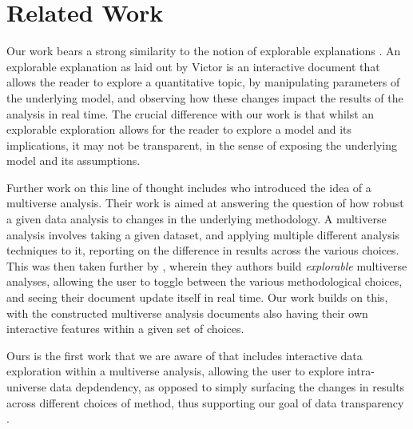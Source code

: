 \section{Related Work}
\label{sec:related}

Our work bears a strong similarity to the notion of explorable explanations \cite{victor11b}.
An explorable explanation as laid out by Victor is an interactive document that allows the reader to
explore a quantitative topic, by manipulating parameters of the underlying model, and observing how these
changes impact the results of the analysis in real time. The crucial difference with our work is that 
whilst an explorable exploration allows for the reader to explore a model and its implications, it may
not be transparent, in the sense of exposing the underlying model and its assumptions.

Further work on this line of thought includes \cite{steegen16} who introduced the idea of a multiverse
analysis. Their work is aimed at answering the question of how robust a given data analysis to changes
in the underlying methodology. A multiverse analysis involves taking a given dataset, and applying 
multiple different analysis techniques to it, reporting on the difference in results across the various choices.
This was then taken further by \cite{dragicevic19}, wherein they authors build \textit{explorable} multiverse
analyses, allowing the user to toggle between the various methodological choices, and seeing their document
update itself in real time. Our work builds on this, with the constructed multiverse analysis documents also
having their own interactive features within a given set of choices.

Ours is the first work that we are aware of that includes interactive data exploration within a multiverse
analysis, allowing the user to explore intra-universe data depdendency, as opposed to simply surfacing
the changes in results across different choices of method, thus supporting our goal of data transparency .